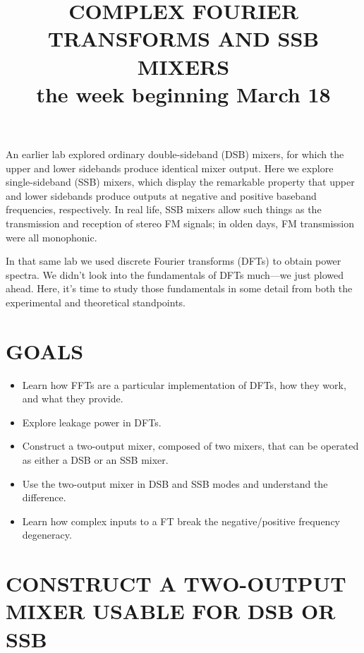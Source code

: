 \documentclass[11pt,preprint]{aastex}
\begin{document}
\def\simlt{\lower.5ex\hbox{$\; \buildrel < \over \sim \;$}}
\def\simgt{\lower.5ex\hbox{$\; \buildrel > \over \sim \;$}}


\title {COMPLEX FOURIER TRANSFORMS AND SSB MIXERS \\
the week beginning March 18}

An earlier lab explored ordinary double-sideband (DSB) mixers, for which
the upper and lower sidebands produce identical mixer output. Here we
explore single-sideband (SSB) mixers, which display the remarkable
property that upper and lower sidebands produce outputs at negative and
positive baseband frequencies, respectively. In real life, SSB mixers
allow such things as the transmission and reception of stereo FM
signals; in olden days, FM transmission were all monophonic.

In that same lab we used discrete Fourier transforms (DFTs) to obtain
power spectra. We didn't look into the fundamentals of DFTs much---we
just plowed ahead. Here, it's time to study those fundamentals in some
detail from both the experimental and theoretical standpoints.

\section{GOALS}

\begin{itemize}

\item Learn how FFTs are a particular implementation of DFTs, how they
work, and what they provide.

\item Explore leakage power in DFTs.

\item Construct a two-output mixer, composed of two mixers, that can be
  operated as either a DSB or an SSB mixer. 

\item Use the two-output mixer in DSB and SSB modes and understand the
  difference. 

\item Learn how complex inputs to a FT break the negative/positive
  frequency degeneracy.

\end{itemize}



\section{ CONSTRUCT A TWO-OUTPUT MIXER USABLE FOR DSB OR SSB}
\label{upperlowerdsb}
\end{document}

